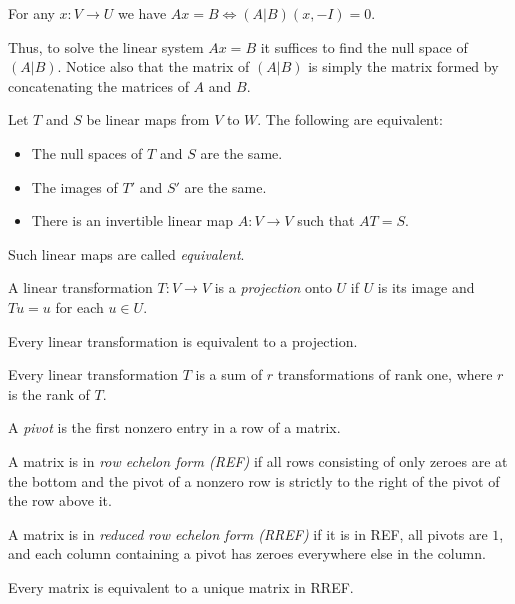 \begin{prop}
  For any $x:V\to U$ we have $Ax=B\iff (A|B)(x,-I)=0$.
\end{prop}
\begin{rem}
  Thus, to solve the linear system $Ax=B$ it suffices to find the null space of
  $(A|B)$. Notice also that the matrix of $(A|B)$ is simply the matrix formed by
  concatenating the matrices of $A$ and $B$.
\end{rem}
\begin{prop}
  Let $T$ and $S$ be linear maps from $V$ to $W$. The following are equivalent:
  \begin{itemize}
    \item The null spaces of $T$ and $S$ are the same.
    \item The images of $T'$ and $S'$ are the same.
    \item There is an invertible linear map $A:V\to V$ such that $AT=S$.
  \end{itemize}
\end{prop}
\begin{defn}
  Such linear maps are called \emph{equivalent}.
\end{defn}
\begin{defn}
  A linear transformation $T:V\to V$ is a \emph{projection} onto $U$ if $U$ is
  its image and $Tu=u$ for each $u\in U$.
\end{defn}
\begin{prop}
  Every linear transformation is equivalent to a projection.
\end{prop}
\begin{cor}
  Every linear transformation $T$ is a sum of $r$ transformations of rank one,
  where $r$ is the rank of $T$.
\end{cor}
\begin{defn}
  A \emph{pivot} is the first nonzero entry in a row of a matrix.

  A matrix is in \emph{row echelon form (REF)} if all rows consisting
  of only zeroes are at the bottom and the pivot of a nonzero row is strictly to
  the right of the pivot of the row above it.

  A matrix is in \emph{reduced row echelon form (RREF)} if it is in REF, all
  pivots are $1$, and each column containing a pivot has zeroes everywhere else
  in the column.
\end{defn}
\begin{prop}
  Every matrix is equivalent to a unique matrix in RREF\@.
\end{prop}
